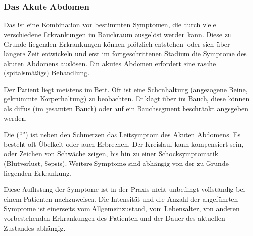 {\subsubsection{Das Akute Abdomen}
\label{topic:akutes-abdomen}





{Das  ist eine Kombination von bestimmten
Symptomen, die
durch viele verschiedene Erkrankungen im Bauchraum ausgelöst
werden kann. Diese zu Grunde liegenden Erkrankungen können
plötzlich entstehen, oder sich über längere Zeit entwickeln
und erst im fortgeschrittenen Stadium die Symptome des
akuten Abdomens auslösen. Ein akutes Abdomen erfordert eine
rasche (spitalsmäßige) Behandlung.
}
{

}{}{}{}

{%
Der Patient liegt meistens im Bett. Oft ist eine
Schonhaltung (angezogene Beine, gekrümmte Körperhaltung) zu
beobachten. Er klagt über  im Bauch, diese können
als diffus (im gesamten Bauch) oder auf ein Bauchsegment
beschränkt angegeben werden.

Die  (\enquote{}) ist
neben den Schmerzen das Leitsymptom des Akuten Abdomens.
Es besteht oft Übelkeit oder auch Erbrechen. Der Kreislauf
kann kompensiert sein, oder Zeichen von Schwäche zeigen, bis
hin zu einer Schocksymptomatik (Blutverlust, Sepsis).
Weitere Symptome sind abhängig von der zu Grunde liegenden
Erkrankung.

Diese Auflistung der Symptome ist in der Praxis nicht
unbedingt vollständig bei einem Patienten nachzuweisen. Die
Intensität und die Anzahl der angeführten Symptome ist
einerseits vom Allgemeinzustand, vom Lebensalter, von
anderen vorbestehenden Erkrankungen des Patienten und der
Dauer des aktuellen Zustandes abhängig.

}}

